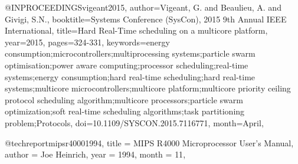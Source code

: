 @INPROCEEDINGS{vigeant2015, 
author={Vigeant, G. and Beaulieu, A. and Givigi, S.N.}, 
booktitle={Systems Conference (SysCon), 2015 9th Annual IEEE International}, 
title={Hard Real-Time scheduling on a multicore platform}, 
year={2015}, 
pages={324-331}, 
keywords={energy consumption;microcontrollers;multiprocessing systems;particle swarm optimisation;power aware computing;processor scheduling;real-time systems;energy consumption;hard real-time scheduling;hard real-time systems;multicore microcontrollers;multicore platform;multicore priority ceiling protocol scheduling algorithm;multicore processors;particle swarm optimization;soft real-time scheduling algorithms;task partitioning problem;Protocols}, 
doi={10.1109/SYSCON.2015.7116771}, 
month={April},}

@techreport{mipsr40001994,
     title = {{MIPS R4000 Microprocessor User's Manual}},
     author = {Joe Heinrich},
     year = {1994},
     month = {11},
}
